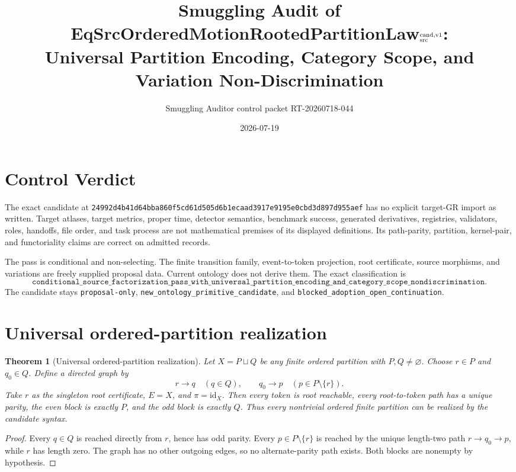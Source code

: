 \documentclass[11pt]{article}
\title{Smuggling Audit of
EqSrcOrderedMotionRootedPartitionLaw\(_{\rm src}^{\rm cand,v1}\):\\
Universal Partition Encoding, Category Scope, and Variation Non-Discrimination}
\author{Smuggling Auditor control packet RT-20260718-044}
\date{2026-07-19}
\newtheorem{theorem}{Theorem}
\begin{document}
\maketitle

\section{Control Verdict}

The exact candidate at
\texttt{24992d4b41d64bba860f5cd61d505d6b1ecaad3917e9195e0cbd3d897d955aef}
has no explicit target-GR import as written. Target atlases, target metrics,
proper time, detector semantics, benchmark success, generated derivatives,
registries, validators, roles, handoffs, file order, and task process are not
mathematical premises of its displayed definitions. Its path-parity,
partition, kernel-pair, and functoriality claims are correct on admitted
records.

The pass is conditional and non-selecting. The finite transition family,
event-to-token projection, root certificate, source morphisms, and variations
are freely supplied proposal data. Current ontology does not derive them.
The exact classification is
\[
\texttt{conditional\_source\_factorization\_pass\_with\_universal\_partition\_encoding\_and\_category\_scope\_nondiscrimination}.
\]
The candidate stays \texttt{proposal-only},
\texttt{new\_ontology\_primitive\_candidate}, and
\texttt{blocked\_adoption\_open\_continuation}.

\section{Universal ordered-partition realization}

\begin{theorem}[Universal ordered-partition realization]
Let \(X=P\sqcup Q\) be any finite ordered partition with \(P,Q\neq\varnothing\).
Choose \(r\in P\) and \(q_0\in Q\). Define a directed graph by
\[
 r\longrightarrow q\quad(q\in Q),\qquad
 q_0\longrightarrow p\quad(p\in P\setminus\{r\}).
\]
Take \(r\) as the singleton root certificate, \(E=X\), and
\(\pi=\mathrm{id}_X\). Then every token is root reachable, every root-to-token
path has a unique parity, the even block is exactly \(P\), and the odd block
is exactly \(Q\). Thus every nontrivial ordered finite partition can be
realized by the candidate syntax.
\end{theorem}

\begin{proof}
Every \(q\in Q\) is reached directly from \(r\), hence has odd parity. Every
\(p\in P\setminus\{r\}\) is reached by the unique length-two path
\(r\to q_0\to p\), while \(r\) has length zero. The graph has no other
outgoing edges, so no alternate-parity path exists. Both blocks are nonempty
by hypothesis.
\end{proof}
\end{document}

